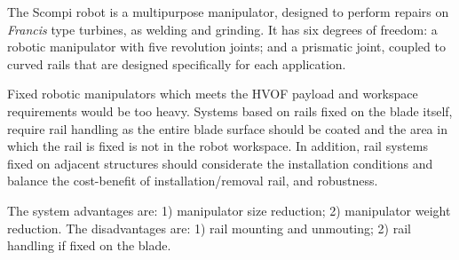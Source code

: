 
The Scompi robot \citep{scompi}%
is a multipurpose manipulator, designed to perform repairs on \textit{Francis}
type turbines, as welding and grinding. It has six degrees of freedom: a robotic
manipulator with five revolution joints; and a prismatic joint, coupled to
curved rails that are designed specifically for each application.



Fixed robotic manipulators which meets the HVOF payload and
workspace requirements would be too heavy. Systems based on rails fixed
on the blade itself, require rail handling as the entire
blade surface should be coated and the area in which the rail is fixed is not in
the robot workspace. In addition, rail systems fixed on adjacent structures
should considerate the installation conditions and balance the cost-benefit
of installation/removal rail, and robustness.

The system advantages are: 1) manipulator size reduction; 2) manipulator
weight reduction. The disadvantages are: 1) rail mounting and unmouting; 2) rail
handling if fixed on the blade.